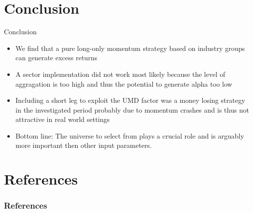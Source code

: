 \documentclass{beamer}
\begin{document}
\section{Conclusion}
\begin{frame}{Conclusion}    
\begin{itemize}
    \item We find that a pure long-only momentum strategy based on industry groups can generate excess returns
    \item A sector implementation did not work most likely because the level of aggragation is too high and thus the potential to generate alpha too low
    \item Including a short leg to exploit the UMD factor was a money losing strategy in the investigated period probably due to momentum crashes and is thus not attractive in real world settings
    \item Bottom line: The universe to select from plays a crucial role and is arguably more important then other input parameters.
    
    
    
\end{itemize}
\end{frame}





\section{References}
\begin{frame}[allowframebreaks]\frametitle{References}
        
        
\end{frame}
\end{document}
